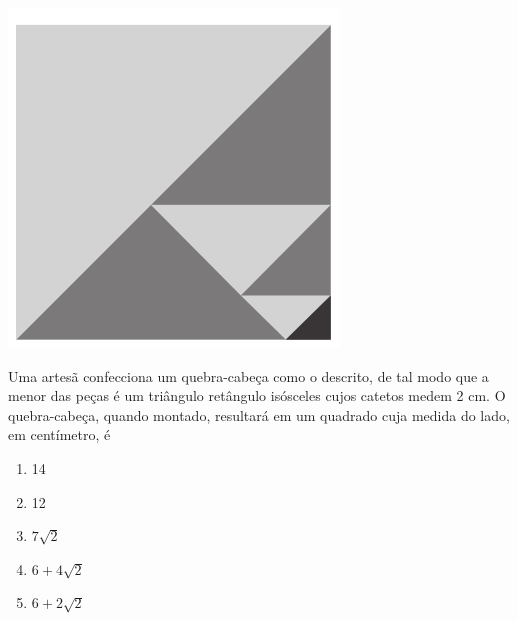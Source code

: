 \documentclass[12pt]{article}
\begin{document}
\begin{multicols}{2}
            \begin{center}
                \includegraphics[scale=0.6]{q40.png}
            \end{center}Uma artesã confecciona um quebra-cabeça como o descrito, de tal modo que a menor das peças é um triângulo retângulo isósceles cujos catetos medem 2 cm. O quebra-cabeça, quando montado, resultará em um quadrado cuja medida do lado, em centímetro, é
            
            \begin{enumerate}[label=(\alph*), noitemsep]
                \item 14
                \item 12
                \item $7\sqrt{2}$ 
                \item $6+4\sqrt{2}$
                \item $6+2\sqrt{2}$ 
            \end{enumerate}
        
            
    \end{multicols}
    
\end{document}
